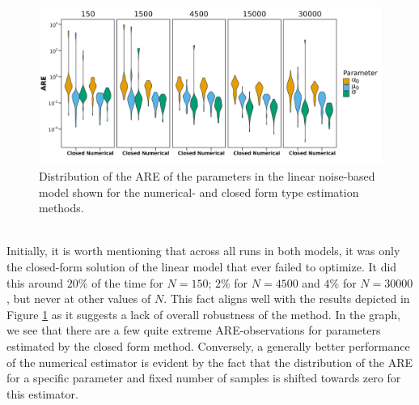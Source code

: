 \begin{figure}[h!]
\begin{center}
    \includegraphics[scale = .1]{figures/ARE_dist_result_plot_Linear.jpeg}
    \caption{Distribution of the ARE of the parameters in the linear noise-based model shown for the numerical- and closed form type estimation methods.}
    \label{figure:ARE_dist_linear_noise}
\end{center}
\end{figure}\\
Initially, it is worth mentioning that across all runs in both models, it was only the closed-form solution of the linear model that ever failed to optimize. It did this around $20\%$ of the time for $N = 150$; $2\%$ for $N = 4500$ and $4\%$ for $N = 30000$, but never at other values of $N$. This fact aligns well with the results depicted in Figure \ref{figure:ARE_dist_linear_noise} as it suggests a lack of overall robustness of the method. In the graph, we see that there are a few quite extreme ARE-observations for parameters estimated by the closed form method. Conversely, a generally better performance of the numerical estimator is evident by the fact that the distribution of the ARE for a specific parameter and fixed number of samples is shifted towards zero for this estimator. 

